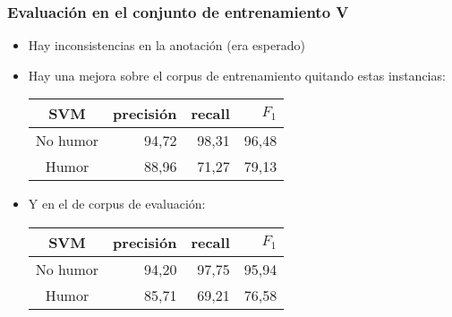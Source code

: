 \begin{frame}
    \frametitle{Evaluación en el conjunto de entrenamiento V}

    \begin{itemize}[<+->]
        \item Hay inconsistencias en la anotación (era esperado)
        \item Hay una mejora sobre el corpus de entrenamiento quitando estas instancias:

        \begin{center}
            \begin{tabular}{ c | r | r | r }
                \textbf{SVM} & precisión & recall & $F_1$ \\
                \hline
                No humor & 94,72 & 98,31 & 96,48 \\
                \hline
                Humor & 88,96 & 71,27 & 79,13 \\
            \end{tabular}
        \end{center}
    \end{itemize}

    \begin{itemize}[<3>]
        \item Y en el de corpus de evaluación:

        \begin{center}
            \begin{tabular}{ c | r | r | r }
                \textbf{SVM} & precisión & recall & $F_1$ \\
                \hline
                No humor & 94,20 & 97,75 & 95,94 \\
                \hline
                Humor & 85,71 & 69,21 & 76,58 \\
            \end{tabular}
        \end{center}
    \end{itemize}
\end{frame}

